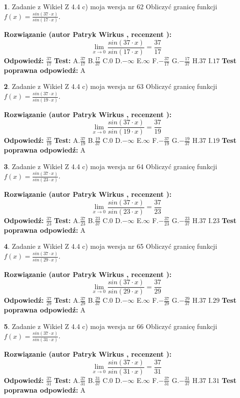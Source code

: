 \documentclass[12pt, a4paper]{article}
\theoremstyle{definition} %
\newtheorem{zad}{}
\newcommand{\zadStart}[1]{\begin{zad}#1\newline}
\newcommand{\zadStop}{\end{zad}}
\newcommand{\rozwStart}[2]{\noindent \textbf{Rozwiązanie (autor #1 , recenzent #2): }\newline}
\newcommand{\rozwStop}{\newline}
\newcommand{\odpStart}{\noindent \textbf{Odpowiedź:}\newline}
\newcommand{\odpStop}{\newline}
\newcommand{\testStart}{\noindent \textbf{Test:}\newline}
\newcommand{\testStop}{\newline}
\newcommand{\kluczStart}{\noindent \textbf{Test poprawna odpowiedź:}\newline}
\newcommand{\kluczStop}{\newline}
\begin{document}
\zadStart{Zadanie z Wikieł Z 4.4 c) moja wersja nr 62}
Obliczyć granicę funkcji $f(x)=\frac{sin(37\cdot x)}{sin(17\cdot x)}$.
\zadStop
\rozwStart{Patryk Wirkus}{}
$$\lim\limits_{x\to 0}\frac{sin(37\cdot x)}{sin(17\cdot x)}=
\frac{37}{17}$$
\rozwStop
\odpStart
$\frac{37}{17}$
\odpStop
\testStart
A.$\frac{37}{17}$
B.$\frac{17}{37}$
C.$0$
D.$-\infty$
E.$\infty$
F.$-\frac{37}{17}$
G.$-\frac{17}{37}$
H.$37$
I.$17$
\testStop
\kluczStart
A
\kluczStop



\zadStart{Zadanie z Wikieł Z 4.4 c) moja wersja nr 63}
Obliczyć granicę funkcji $f(x)=\frac{sin(37\cdot x)}{sin(19\cdot x)}$.
\zadStop
\rozwStart{Patryk Wirkus}{}
$$\lim\limits_{x\to 0}\frac{sin(37\cdot x)}{sin(19\cdot x)}=
\frac{37}{19}$$
\rozwStop
\odpStart
$\frac{37}{19}$
\odpStop
\testStart
A.$\frac{37}{19}$
B.$\frac{19}{37}$
C.$0$
D.$-\infty$
E.$\infty$
F.$-\frac{37}{19}$
G.$-\frac{19}{37}$
H.$37$
I.$19$
\testStop
\kluczStart
A
\kluczStop



\zadStart{Zadanie z Wikieł Z 4.4 c) moja wersja nr 64}
Obliczyć granicę funkcji $f(x)=\frac{sin(37\cdot x)}{sin(23\cdot x)}$.
\zadStop
\rozwStart{Patryk Wirkus}{}
$$\lim\limits_{x\to 0}\frac{sin(37\cdot x)}{sin(23\cdot x)}=
\frac{37}{23}$$
\rozwStop
\odpStart
$\frac{37}{23}$
\odpStop
\testStart
A.$\frac{37}{23}$
B.$\frac{23}{37}$
C.$0$
D.$-\infty$
E.$\infty$
F.$-\frac{37}{23}$
G.$-\frac{23}{37}$
H.$37$
I.$23$
\testStop
\kluczStart
A
\kluczStop



\zadStart{Zadanie z Wikieł Z 4.4 c) moja wersja nr 65}
Obliczyć granicę funkcji $f(x)=\frac{sin(37\cdot x)}{sin(29\cdot x)}$.
\zadStop
\rozwStart{Patryk Wirkus}{}
$$\lim\limits_{x\to 0}\frac{sin(37\cdot x)}{sin(29\cdot x)}=
\frac{37}{29}$$
\rozwStop
\odpStart
$\frac{37}{29}$
\odpStop
\testStart
A.$\frac{37}{29}$
B.$\frac{29}{37}$
C.$0$
D.$-\infty$
E.$\infty$
F.$-\frac{37}{29}$
G.$-\frac{29}{37}$
H.$37$
I.$29$
\testStop
\kluczStart
A
\kluczStop



\zadStart{Zadanie z Wikieł Z 4.4 c) moja wersja nr 66}
Obliczyć granicę funkcji $f(x)=\frac{sin(37\cdot x)}{sin(31\cdot x)}$.
\zadStop
\rozwStart{Patryk Wirkus}{}
$$\lim\limits_{x\to 0}\frac{sin(37\cdot x)}{sin(31\cdot x)}=
\frac{37}{31}$$
\rozwStop
\odpStart
$\frac{37}{31}$
\odpStop
\testStart
A.$\frac{37}{31}$
B.$\frac{31}{37}$
C.$0$
D.$-\infty$
E.$\infty$
F.$-\frac{37}{31}$
G.$-\frac{31}{37}$
H.$37$
I.$31$
\testStop
\kluczStart
A
\kluczStop
\end{document}
